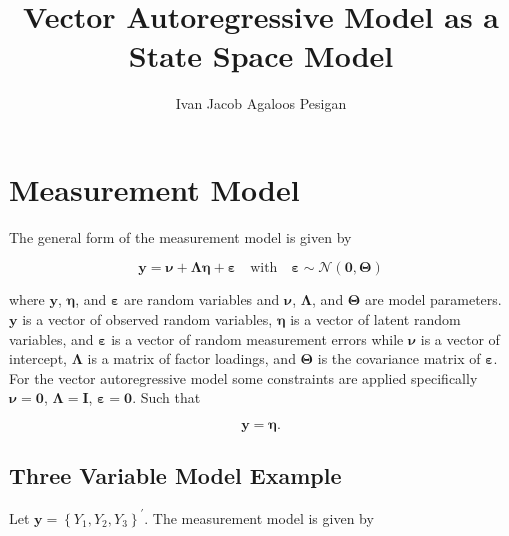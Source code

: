 \documentclass{article}
\title{Vector Autoregressive Model as a State Space Model}
\author{Ivan Jacob Agaloos Pesigan}
\date{}
\begin{document}
\maketitle

\section{Measurement Model}

The general form of the measurement model is given by

\begin{equation}
    \mathbf{y}
    =
    \boldsymbol{\nu}
    +
    \boldsymbol{\Lambda}
    \boldsymbol{\eta}
    +
    \boldsymbol{\varepsilon}
    \quad
    \mathrm{with}
    \quad
    \boldsymbol{\varepsilon}
    \sim
    \mathcal{N}
    \left(
    \mathbf{0},
    \boldsymbol{\Theta}
    \right)
\end{equation}

\noindent where $\mathbf{y}$, $\boldsymbol{\eta}$, and $\boldsymbol{\varepsilon}$ are random variables and $\boldsymbol{\nu}$, $\boldsymbol{\Lambda}$, and $\boldsymbol{\Theta}$ are model parameters. $\mathbf{y}$ is a vector of observed random variables, $\boldsymbol{\eta}$ is a vector of latent random variables,
and $\boldsymbol{\varepsilon}$ is a vector of random measurement errors while $\boldsymbol{\nu}$ is a vector of intercept, $\boldsymbol{\Lambda}$ is a matrix of factor loadings, and $\boldsymbol{\Theta}$ is the covariance matrix of $\boldsymbol{\varepsilon}$. For the vector autoregressive model some constraints are applied specifically $\boldsymbol{\nu} = \mathbf{0}$, $\boldsymbol{\Lambda} = \mathbf{I}$,
$\boldsymbol{\varepsilon} = \mathbf{0}$. Such that 

\begin{equation}
    \mathbf{y} = \boldsymbol{\eta} .
\end{equation}

\subsection{Three Variable Model Example}

Let $\mathbf{y} = \left\{ Y_{1} , Y_{2}, Y_{3} \right\}^{\prime}$. The measurement model is given by
\end{document}
